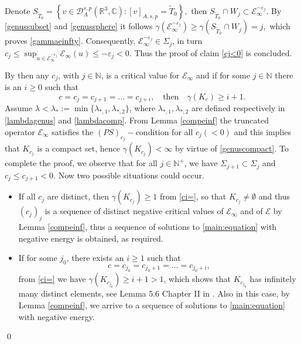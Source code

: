 \documentclass[leqno,11pt]{amsart}
\newcommand{\R}{\mathbb R}
\newcommand{\CC}{\mathbb C}
\newcommand{\cE}{{\mathcal E}}
\newcommand{\cD}{{\mathcal D}}
\numberwithin{equation}{section}
\begin{document}
Denote $S_{\tilde T_0}=\left\{v \in \cD^{s,p}_A(\R^3,\CC): [v]_{A,s,p}=\tilde T_0\right\},$ then $S_{\tilde T_0}\cap W_{j}\subset
\cE_\infty^{-\varepsilon_{j}}$. By \eqref{genussubset} and \eqref{genussphere} it follows
$\gamma(\cE_\infty^{-\varepsilon_{j}})\ge \gamma(S_{\tilde T_0}\cap W_{j})=j,$
which proves \eqref{gammaeinfty}. Consequently, $\cE_\infty^{-\varepsilon_{j}}\in\Sigma_{j}$, in turn
$c_j\le \sup_{u\in \cE_\infty^{-\varepsilon_{j}}}\cE_\infty(u)\le -\varepsilon_{j}<0.$
Thus the proof of  claim \eqref{cj<0} is concluded.

By \cite[Theorem 3.3]{GP87} then any $c_j$, with $j\in\mathbb N$, is a critical value for $\cE_\infty$ and if for some $j\in \mathbb{N}$ there is an $i\ge0$ such that
\begin{equation}\label{ci=}
c=c_{j}=c_{j+1}=\dots=c_{j+i},\quad\text{then}\quad \gamma(K_{c})\ge i+1.
\end{equation}
Assume $\lambda<\lambda_*:=\min\{\lambda_{*,1}, \lambda_{*,2}\}$, where $\lambda_{*,1}, \lambda_{*,2}$ are defined respectively in \eqref{lambdagenus} and \eqref{lambdacomp}. From Lemma \ref{compeinf} the truncated operator $\cE_\infty$ satisfies the $(PS)_{c_j}-$condition for all
$c_j(<0)$ and this implies that
$K_{c_j}$ is a compact set, hence $\gamma(K_{c_j})<\infty$ by virtue of \eqref{genuscompact}.
To complete the proof, we observe that for all $j\in \mathbb{N}^+$, we have
$\Sigma_{j+1}\subset\Sigma_{j}$ and $c_{j}\le c_{j+1}<0.$
Now two possible situations could occur.
\begin{itemize}
    \item If all $c_{j}$ are distinct, then $\gamma(K_{c_{j}})\ge 1$ from \eqref{ci=}, so that $K_{c_{j}}\neq\emptyset$ and
thus $(c_{j})_j$ is a sequence of distinct negative critical values of $\cE_\infty$ and of $\cE$ by Lemma \ref{compeinf}, thus a sequence of solutions to \eqref{main:equation} with negative energy is obtained, as required.
\item If for some $j_{0}$, there exists an $i\ge 1$ such that
$$
    c=c_{j_{0}}=c_{j_{0}+1}=\dots=c_{j_{0}+i},
$$
from \eqref{ci=} we have $\gamma(K_{c_{j_{0}}})\ge i+1>1$,
which shows that $K_{c_{j_{0}}}$ has infinitely many distinct elements, see Lemma 5.6 Chapter II in \cite{struwe}.
Also in this case, by Lemma \ref{compeinf}, we arrive to a sequence of solutions to \eqref{main:equation} with negative energy.

\end{itemize}

\qed
\end{document}
